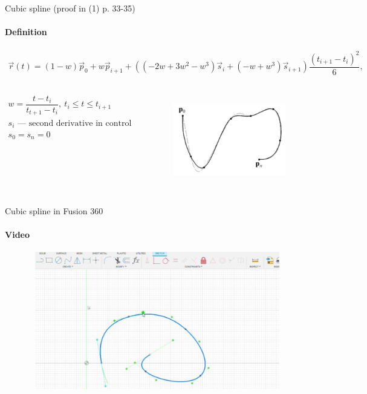 \documentclass[aspectratio=169]{beamer}
\begin{document}
\begin{frame}[t]{Cubic spline (proof in (1) p. 33-35)}
\framesubtitle{Definition}
\vspace{-0.8cm}
\begin{align*}
    \vec{r}(t) = (1-w)\vec{p}_0 + w\vec{p}_{i+1} + \left((-2w+3w^2-w^3)\vec{s}_i+(-w+w^3)\vec{s}_{i+1}\right)\dfrac{(t_{i+1}-t_i)^2}{6},
\end{align*}
    \begin{columns}[T,onlytextwidth]
        \begin{column}{0.49\textwidth}
            \begin{align*}
                w=\dfrac{t-t_i}{t_{t+1}-t_i},\ t_i \leq t \leq t_{i+1} \\
                s_i \text{ --- second derivative in control points} \\ 
                s_0 = s_n = 0
            \end{align*}
        \end{column}
        \begin{column}{0.49\textwidth}
            \vspace{-0.3cm}
            \begin{figure}[H]
                \centering\includegraphics[height=4cm,width=1\textwidth,keepaspectratio]{cubic_spline_book.png}
                \label{fig:cubic_spline_book.png}
            \end{figure} 
        \end{column}
    \end{columns}
\end{frame}

\begin{frame}[t]{Cubic spline in Fusion 360}
    \framesubtitle{Video}
    \vspace{-0.6cm}
    \begin{figure}[H]
        \href{https://disk.yandex.ru/i/zOF29cUwON7hsw}{
            \centering\includegraphics[height=6cm,width=1\textwidth,keepaspectratio]{cubic_spline_video_preview.jpg}}
    \end{figure}
\end{frame}
\end{document}
